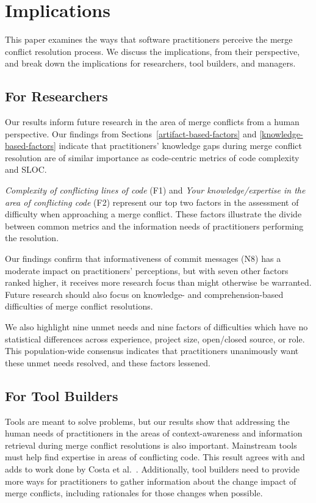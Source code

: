 \section{Implications}\label{implications}
This paper examines the ways that software practitioners perceive the merge conflict resolution process.
We discuss the implications, from their perspective, and break down the implications for researchers, tool builders, and managers.

\subsection{For Researchers}
Our results inform future research in the area of merge conflicts from a human perspective.
Our findings from Sections~\ref{artifact-based-factors} and \ref{knowledge-based-factors} indicate that practitioners' knowledge gaps during merge conflict resolution are of similar importance as code-centric metrics of code complexity and SLOC.

\textit{Complexity of conflicting lines of code} (F1) and \textit{Your knowledge/expertise in the area of conflicting code} (F2) represent our top two factors in the assessment of difficulty when approaching a merge conflict.
These factors illustrate the divide between common metrics and the information needs of practitioners performing the resolution.
 
Our findings confirm that informativeness of commit messages (N8) has a moderate impact on practitioners' perceptions, but with seven other factors ranked higher, it receives more research focus than might otherwise be warranted.
Future research should also focus on knowledge- and comprehension-based difficulties of  merge conflict resolutions.

We also highlight nine unmet needs and nine factors of difficulties which have no statistical differences across experience, project size, open/closed source, or role.
This population-wide consensus indicates that practitioners unanimously want these unmet needs resolved, and these factors lessened.

\subsection{For Tool Builders}
Tools are meant to solve problems, but our results show that addressing the human needs of  practitioners in the areas of context-awareness and information retrieval during merge conflict resolutions is also important.
Mainstream tools must help find expertise in areas of conflicting code.
This result agrees with and adds to work done by Costa et al.~\cite{CostaSarma}.
Additionally, tool builders need to provide more ways for practitioners to gather information about the change impact of merge conflicts, including rationales for those changes when possible.

